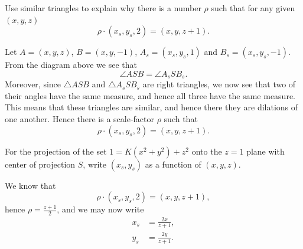 \documentclass{ximera}
\begin{document}
\begin{problem}
  Use similar triangles to explain why there is a number $\rho$ such
  that for any given $(x,y,z)$
  \[
  \rho\cdot(x_s,y_s,2) = (x,y,z+1).
  \]
  \begin{freeResponse}
    Let $A = (x,y,z)$, $B= (x,y,-1)$, $A_s = (x_s,y_s,1)$ and
    $B_s=(x_s,y_s,-1)$. From the diagram above we see that
    \[
    \angle ASB = \angle A_s S B_s.
    \]
    Moreover, since $\triangle ASB$ and $\triangle A_s S B_s$ are
    right triangles, we now see that two of their angles have the same
    measure, and hence all three have the same measure. This means
    that these triangles are similar, and hence there they are
    dilations of one another. Hence there is a scale-factor $\rho$
    such that
    \[
    \rho\cdot(x_s,y_s,2) = (x,y,z+1).
    \]
  \end{freeResponse}
\end{problem}

\begin{problem}
  For the projection of the set $1=K\left(x^{2}+y^{2}\right)+z^{2}$
  onto the $z=1$ plane with center of projection $S$, write
  $(x_{s},y_{s})$ as a function of $(x,y,z)$.
  \begin{freeResponse}
    We know that
    \[
    \rho\cdot(x_{s},y_{s},2)=(x,y,z+1),
    \]
    hence $\rho=\frac{z+1}{2}$, and we may now write
    \begin{align*}
      x_{s} &=\frac{2x}{z+1},\\
      y_{s} &=\frac{2y}{z+1}.
    \end{align*}
  \end{freeResponse}
\end{problem}
\end{document}
